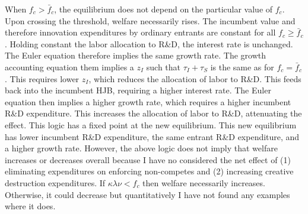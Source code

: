 \documentclass[12pt,english]{article}
\theoremstyle{remark}
\begin{document}
When $f_c > \bar{f}_c$, the equilibrium does not depend on the particular value of $f_c$. Upon crossing the threshold, welfare necessarily rises. The incumbent value and therefore innovation expenditures by ordinary entrants are constant for all $f_c \ge \bar{f}_c$. Holding constant the labor allocation to R\&D, the interest rate is unchanged. The Euler equation therefore implies the same growth rate. The growth accounting equation them implies a $z_I$ such that $\tau_I + \tau_S$ is the same as for $f_c = \bar{f}_c$. This requires lower $z_I$, which reduces the allocation of labor to R\&D. This feeds back into the incumbent HJB, requiring a higher interest rate. The Euler equation then implies a higher growth rate, which requires a higher incumbent R\&D expenditure. This increases the allocation of labor to R\&D, attenuating the effect. This logic has a fixed point at the new equilibrium. This new equilibrium has lower incumbent R\&D expenditure, the same entrant R\&D expenditure, and a higher growth rate. However, the above logic does not imply that welfare increases or decreases overall because I have no considered the net effect of (1) eliminating expenditures on enforcing non-competes and (2) increasing creative destruction expenditures. If $\kappa \lambda \nu < f_c$ then welfare necessarily increases. Otherwise, it could decrease but quantitatively I have not found any examples where it does.
\end{document}
